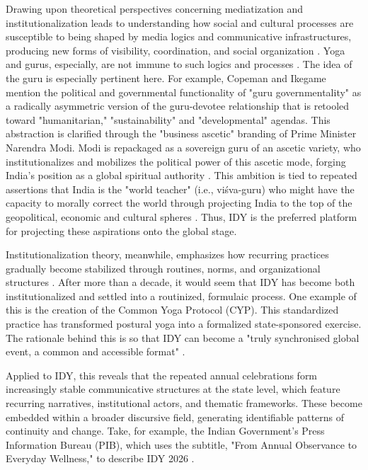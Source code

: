 \documentclass[11pt]{article}
\begin{document}
Drawing upon theoretical perspectives concerning mediatization and institutionalization leads to understanding how social and cultural processes are susceptible to being shaped by media logics and communicative infrastructures, producing new forms of visibility, coordination, and social organization \cite{hjarvard2008}. Yoga and gurus, especially, are not immune to such logics and processes \cite{copeman2012,copeman2023}. The idea of the  guru is especially pertinent here. For example, Copeman and Ikegame \cite{copeman2012} mention the political and governmental functionality of "guru governmentality" as a radically asymmetric version of the guru-devotee relationship that is retooled toward "humanitarian," "sustainability" and "developmental" agendas. This abstraction is clarified through the "business ascetic" branding of Prime Minister Narendra Modi. Modi is repackaged as a sovereign guru of an ascetic variety, who institutionalizes and mobilizes the political power of this ascetic mode, forging India's position as a global spiritual authority \cite{maitra2022}. This ambition is tied to repeated assertions that India is the "world teacher" (i.e., viśva-guru) who might have the capacity to morally correct the world through projecting India to the top of the geopolitical, economic and cultural spheres \cite{mannathukkaren2023,mccartney2023}. Thus, IDY is the preferred platform for projecting these aspirations onto the global stage.

Institutionalization theory, meanwhile, emphasizes how recurring practices gradually become stabilized through routines, norms, and organizational structures \cite{stavolo2026}. After more than a decade, it would seem that IDY has become both institutionalized and settled into a routinized, formulaic process. One example of this is the creation of the Common Yoga Protocol (CYP). This standardized practice has transformed postural yoga into a formalized state-sponsored exercise. The rationale behind this is so that IDY can become a "truly synchronised global event, a common and accessible format" \cite{pib_idy_2026}. 

Applied to IDY, this reveals that the repeated annual celebrations form increasingly stable communicative structures at the state level, which feature recurring narratives, institutional actors, and thematic frameworks. These become embedded within a broader discursive field, generating identifiable patterns of continuity and change. Take, for example, the Indian Government's Press Information Bureau (PIB), which uses the subtitle, "From Annual Observance to Everyday Wellness," to describe IDY 2026 \cite{pib_idy_2026}.
\end{document}

